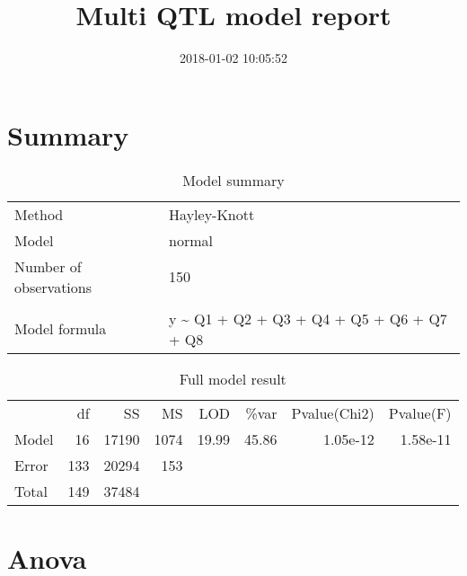 \documentclass[a4paper,11pt]{article}\usepackage[]{graphicx}\usepackage[]{color}
\title{Multi QTL model report}%
\author{\vspace{-5ex}}
\date{2018-01-02 10:05:52}
\begin{document}


\maketitle
\singlespacing

\section{Summary}

\begin{table}[ht]
\begin{flushleft}
\caption{Model summary} 
\label{modSum}
\begin{tabular}{ll}
  Method & Hayley-Knott \\ 
  Model & normal \\ 
  Number of observations & 150 \\ 
   &  \\ 
  Model formula & y \~{} Q1 + Q2 + Q3 + Q4 + Q5 + Q6 + Q7 + Q8 \\ 
  \end{tabular}
\end{flushleft}
\end{table}
\begin{table}[ht]
\begin{flushleft}
\caption{Full model result} 
\label{modRes}
\begin{tabular}{lrrrrrrr}
  & df & SS & MS & LOD & \%var & Pvalue(Chi2) & Pvalue(F) \\ 
 Model & 16 & 17190 & 1074 & 19.99 & 45.86 & 1.05e-12 & 1.58e-11 \\ 
  Error & 133 & 20294 & 153 &  &  &  &  \\ 
  Total & 149 & 37484 &  &  &  &  &  \\ 
  \end{tabular}
\end{flushleft}
\end{table}

\section{Anova}
\end{document}
